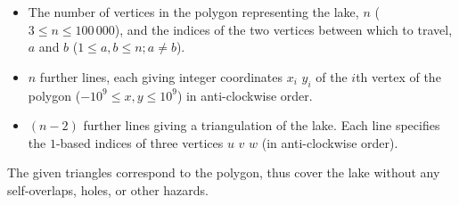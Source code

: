 

\begin{itemize}
  \item The number of vertices in the polygon representing the lake,
        $n$ ($3 \le n \le 100\,000$), and the indices of the two vertices between
        which to travel, $a$ and $b$ ($1 \le a, b \le n; a \ne b$).
  \item $n$ further lines, each giving integer coordinates $x_i$ $y_i$ of the $i$th
        vertex of the polygon ($-10^9 \le x, y \le 10^9$) in anti-clockwise
        order.
  \item $(n-2)$ further lines giving a triangulation of the lake.
        Each line specifies the $1$-based indices of three vertices $u$ $v$ $w$ (in anti-clockwise order).
\end{itemize}

The given triangles correspond to the polygon, thus cover the lake
without any self-overlaps, holes, or other hazards.

